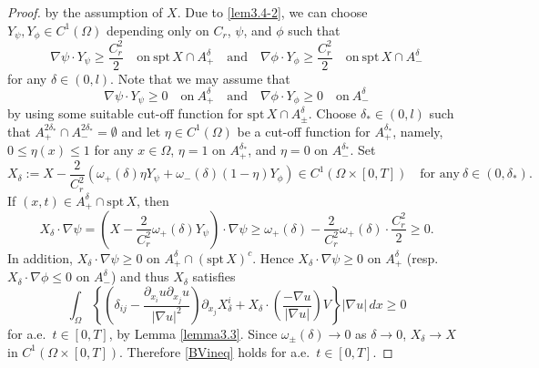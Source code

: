 \documentclass{amsart}
\theoremstyle{definition}
\newcommand{\spt}{\mathrm{spt}\,}
\begin{document}
\begin{proof}
by the assumption of $X$. 
Due to \eqref{lem3.4-2}, we can choose $Y_\psi, Y_\phi \in C^1 (\Omega)$
depending only on $C_r$, $\psi$, and $\phi$ such that
\begin{equation}
\nabla \psi \cdot Y_\psi \geq \frac{C_r ^2}{2} \quad \text{on} \ \spt X \cap A_+ ^\delta 
\quad \text{and} \quad
\nabla \phi \cdot Y_\phi \geq \frac{C_r ^2}{2} \quad \text{on} \ \spt X \cap A_- ^\delta
\end{equation}
for any $\delta \in (0,l)$. 
Note that we may assume that
\[
\nabla \psi \cdot Y_\psi \geq 0 \quad \text{on} \ A_+ ^\delta 
\quad \text{and} \quad
\nabla \phi \cdot Y_\phi \geq 0 \quad \text{on} \ A_- ^\delta
\]
by using some suitable cut-off function for $\spt X \cap A_\pm ^\delta$.
Choose $\delta_\ast \in (0,l)$ such that $A_+ ^{2\delta_\ast} \cap A_- ^{2\delta_\ast} =\emptyset$ and let $\eta \in C^1 (\Omega)$ be a cut-off function for $A_+ ^{\delta_\ast}$, namely,
$0\leq \eta (x)\leq 1$ for any $x\in \Omega$,
$\eta =1$ on $A_+ ^{\delta_\ast}$, and $\eta =0$ on $A_- ^{\delta _\ast}$.
Set
\[
X_\delta := X - \frac{2}{C_r ^2} (\omega_+ (\delta) \eta Y_\psi 
+ \omega _- (\delta) (1-\eta) Y_\phi) \in C^1 (\Omega \times [0,T]) \quad \text{for any} \ \delta \in (0,\delta_\ast).
\]
If $(x,t) \in A_+ ^\delta \cap \spt X$, then 
\[
X_\delta \cdot \nabla \psi 
=
\left( X - \frac{2}{C_r ^2} \omega_+ (\delta) Y_\psi \right) \cdot \nabla \psi
\geq 
\omega_+ (\delta) - \frac{2}{C_r ^2} \omega_+ (\delta) \cdot \frac{C_r ^2}{2}\geq 0.
\]
In addition, $X_\delta \cdot \nabla \psi \geq 0$ on $A_+ ^\delta \cap (\spt X)^c$. Hence
$X_\delta \cdot \nabla \psi \geq 0$ on $A_+ ^\delta$ 
(resp. $X_\delta \cdot \nabla \phi \leq 0$ on $A_- ^\delta$)
and thus $X_\delta$ satisfies 
\begin{equation*}
\int_{\Omega} \left\{ 
\left( \delta_{ij} - \frac{ \partial_{x_i} u \partial _{x_j} u }{|\nabla u|^2} \right)
\partial_{x_j} X_\delta ^i 
+
X_\delta \cdot \left(\frac{-\nabla u}{|\nabla u|}\right) V 
\right\}
|\nabla u| \, dx \geq 0
\end{equation*}
for a.e.\ $t \in [0,T]$, by Lemma \ref{lemma3.3}. Since $\omega _\pm (\delta)\to 0$ as 
$\delta \to 0$, $X_\delta \to X$ in $C^1 (\Omega \times [0,T])$. 
Therefore \eqref{BVineq} holds 
for a.e.\ $t \in [0,T]$.


\end{proof}
\end{document}
